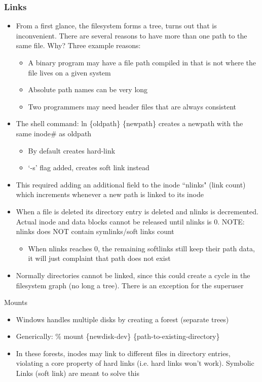 \subsubsection{Links}
\begin{itemize}
    \item From a first glance, the filesystem forms a tree, turns out that is inconvenient. There are several reasons to have more than one path to the same file. Why? Three example reasons:
    \begin{itemize}
        \item A binary program may have a file path compiled in that is not where the file lives on a given system
        \item Absolute path names can be very long
        \item Two programmers may need header files that are always consistent
    \end{itemize}
    \item The shell command: ln \{oldpath\} \{newpath\} creates a newpath with the same inode\# as oldpath
    \begin{itemize}
        \item By default creates hard-link
        \item `-s' flag added, creates soft link instead
    \end{itemize}
    \item This required adding an additional field to the inode ``nlinks" (link count) which increments whenever a new path is linked to its inode
    \item When a file is deleted its directory entry is deleted and nlinks is decremented. Actual inode and data blocks cannot be released until nlinks is 0. NOTE: nlinks does NOT contain symlinks/soft links count
    \begin{itemize}
        \item When nlinks reaches 0, the remaining softlinks still keep their path data, it will just complaint that path does not exist
    \end{itemize}
    \item Normally directories cannot be linked, since this could create a cycle in the filesystem graph (no long a tree). There is an exception for the superuser
\end{itemize}
Mounts
\begin{itemize}
    \item Windows handles multiple disks by creating a forest (separate trees)
    \item Generically: \% mount \{newdisk-dev\} \{path-to-existing-directory\}
    \item In these forests, inodes may link to different files in directory entries, violating a core property of hard links (i.e. hard links won't work). Symbolic Links (soft link) are meant to solve this
\end{itemize}
